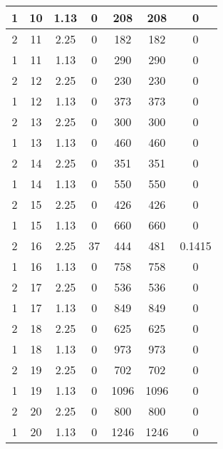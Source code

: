 \documentclass[letterpaper, 12pt]{article}
\begin{document}
\begin{longtable}{|c|c|c|c|c|c|c|}
\hline
1 & 10 & 1.13 & 0 & 208 & 208 & 0 \\
\hline
2 & 11 & 2.25 & 0 & 182 & 182 & 0 \\
\hline
1 & 11 & 1.13 & 0 & 290 & 290 & 0 \\
\hline
2 & 12 & 2.25 & 0 & 230 & 230 & 0 \\
\hline
1 & 12 & 1.13 & 0 & 373 & 373 & 0 \\
\hline
2 & 13 & 2.25 & 0 & 300 & 300 & 0 \\
\hline
1 & 13 & 1.13 & 0 & 460 & 460 & 0 \\
\hline
2 & 14 & 2.25 & 0 & 351 & 351 & 0 \\
\hline
1 & 14 & 1.13 & 0 & 550 & 550 & 0 \\
\hline
2 & 15 & 2.25 & 0 & 426 & 426 & 0 \\
\hline
1 & 15 & 1.13 & 0 & 660 & 660 & 0 \\
\hline
2 & 16 & 2.25 & 37 & 444 & 481 & 0.1415 \\
\hline
1 & 16 & 1.13 & 0 & 758 & 758 & 0 \\
\hline
2 & 17 & 2.25 & 0 & 536 & 536 & 0 \\
\hline
1 & 17 & 1.13 & 0 & 849 & 849 & 0 \\
\hline
2 & 18 & 2.25 & 0 & 625 & 625 & 0 \\
\hline
1 & 18 & 1.13 & 0 & 973 & 973 & 0 \\
\hline
2 & 19 & 2.25 & 0 & 702 & 702 & 0 \\
\hline
1 & 19 & 1.13 & 0 & 1096 & 1096 & 0 \\
\hline
2 & 20 & 2.25 & 0 & 800 & 800 & 0 \\
\hline
1 & 20 & 1.13 & 0 & 1246 & 1246 & 0 \\
\hline
\end{longtable}
\end{document}
